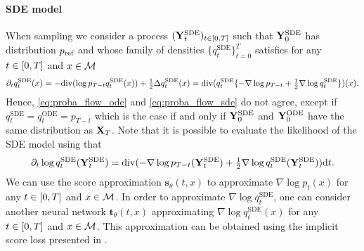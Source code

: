 \paragraph{SDE model}
When sampling we consider a process $(\mathbf{Y}^{\mathrm{SDE}}_t)_{t \in \left[0,T\right]}$ such that
$\mathbf{Y}^{\mathrm{SDE}}_0$ has distribution $p_{\textup{ref}}$ and whose family of densities
$\{q_t^{\mathrm{SDE}}\}_{t=0}^T$ satisfies for any $t \in \left[0,T\right]$ and $x \in \mathcal M$
\begin{equation}
  \label{eq:proba_flow_sde}
  \partial_t q_t^{\mathrm{SDE}}(x) = -\mathrm{div}(\log p_{T-t} q_t^{\mathrm{SDE}}(x)) +\tfrac{1}{2}\Delta q_t^{\mathrm{SDE}}(x) = \mathrm{div}(q_t^{\mathrm{SDE}}\{-\nabla\log p_{T-t} + \tfrac{1}{2}\nabla\log q_t^{\mathrm{SDE}}\})(x)  . 
\end{equation}
Hence, \cref{eq:proba_flow_ode} and \cref{eq:proba_flow_sde} do not agree,
except if $q_t^{\mathrm{SDE}} = q_t^{\mathrm{ODE}} = p_{T-t}$ which is the case if and only if $\mathbf{Y}^{\mathrm{SDE}}_0$ and
$\mathbf{Y}_0^{\mathrm{ODE}}$ have the same distribution as $\mathbf{X}_T$. Note that it is possible to
evaluate the likelihood of the SDE model using that
\begin{equation}
  \partial_t \log q_t^{\mathrm{SDE}}(\mathbf{Y}^{\mathrm{SDE}}_t) = \mathrm{div}(-\nabla\log p_{T-t}(\mathbf{Y}^{\mathrm{SDE}}_t) +\tfrac{1}{2}\nabla\log q_t^{\mathrm{SDE}}(\mathbf{Y}^{\mathrm{SDE}}_t)) \mathrm{d} t  . 
\end{equation}
We can use the score approximation $\bm{s}_\theta(t,x)$ to approximate
$\nabla \log p_t(x)$ for any $t \in \left[0,T\right]$ and $x \in \mathcal M$. In order to
approximate $\nabla \log q_t^{\mathrm{SDE}}$, one can consider another neural network
$\bm{t}_\theta(t,x)$ approximating $\nabla \log q_t^{\mathrm{SDE}}(x)$ for any $t \in \left[0,T\right]$
and $x \in \mathcal M$. This approximation can be obtained using the implicit score loss
presented in .


